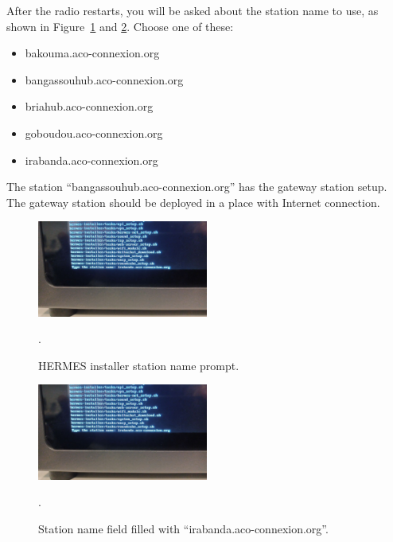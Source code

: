 \documentclass[11pt,a4paper]{article}
\begin{document}
After the radio restarts, you will be asked about the station name to use, as shown in Figure~\ref{fig:inst5} and \ref{fig:inst6}. Choose one of these:
\begin{itemize}
\item bakouma.aco-connexion.org
\item bangassouhub.aco-connexion.org
\item briahub.aco-connexion.org
\item goboudou.aco-connexion.org
\item irabanda.aco-connexion.org
\end{itemize}

The station ``bangassouhub.aco-connexion.org'' has the gateway station setup. The gateway station should be deployed
in a place with Internet connection.

\begin{figure}[H]
  \centering
  \includegraphics[width=0.5\textwidth]{pictures/inst-6.jpg}
  \caption{HERMES installer station name prompt.}.
  \label{fig:inst5}
\end{figure}

\begin{figure}[H]
  \centering
  \includegraphics[width=0.5\textwidth]{pictures/inst-6.jpg}
  \caption{Station name field filled with ``irabanda.aco-connexion.org''.}.
  \label{fig:inst6}
\end{figure}





\end{document}
